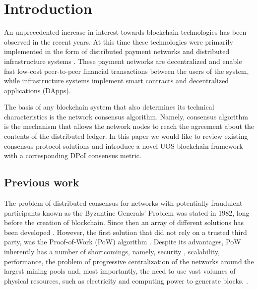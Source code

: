 \documentclass[a4paper,12pt]{article}
\begin{document}
\section{Introduction}

An unprecedented increase in interest towards blockchain technologies has been observed in the recent years. At this time these technologies were primarily implemented in the form of distributed payment networks \cite{satoshi, stellar, dash, nano} and distributed infrastructure systems \cite{etherium, eos, hyperledger, neo}. These payment networks are decentralized and enable fast low-cost peer-to-peer financial transactions between the users of the system, while infrastructure systems implement smart contracts and decentralized applications (DApps).

The basis of any blockchain system that also determines its technical characteristics is the network consensus algorithm. Namely, consensus algorithm is the mechanism that allows the network nodes to reach the agreement about the contents of the distributed ledger. In this paper we would like to review existing consensus protocol solutions and introduce a novel U{\degree}OS blockchain framework with a corresponding DPoI consensus metric.


\subsection{Previous work}

The problem of distributed consensus for networks with potentially fraudulent participants known as the Byzantine Generals' Problem was stated in 1982, long before the creation of blockchain. \cite{Lamport} Since then an array of different solutions has been developed \cite{Castro}. However, the first solution that did not rely on a trusted third party, was the Proof-of-Work (PoW) algorithm \cite{satoshi}. Despite its advantages, PoW inherently has a number of shortcomings, namely, security \cite{Eyal}, scalability, performance\cite{Croman}, the problem of progressive centralization of the networks around the largest mining pools \cite{Buterin} and, most importantly, the need to use vast volumes of physical resources, such as electricity and computing power to generate blocks. \cite{Bentov}. 
\end{document}
